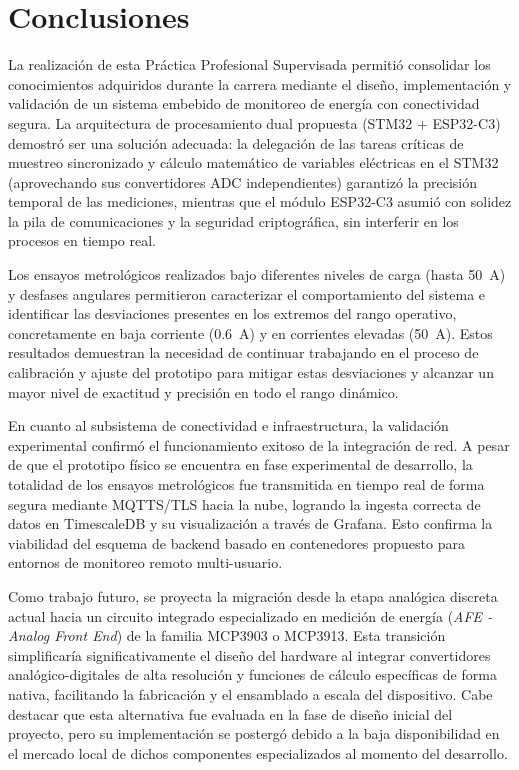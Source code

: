\documentclass[12pt, a4paper]{article} %
\begin{document}
\section{Conclusiones}

La realización de esta Práctica Profesional Supervisada permitió consolidar los conocimientos adquiridos durante la carrera mediante el diseño, implementación y validación de un sistema embebido de monitoreo de energía con conectividad segura. La arquitectura de procesamiento dual propuesta (STM32 + ESP32-C3) demostró ser una solución adecuada: la delegación de las tareas críticas de muestreo sincronizado y cálculo matemático de variables eléctricas en el STM32 (aprovechando sus convertidores ADC independientes) garantizó la precisión temporal de las mediciones, mientras que el módulo ESP32-C3 asumió con solidez la pila de comunicaciones y la seguridad criptográfica, sin interferir en los procesos en tiempo real.

Los ensayos metrológicos realizados bajo diferentes niveles de carga (hasta \qty{50}{\ampere}) y desfases angulares permitieron caracterizar el comportamiento del sistema e identificar las desviaciones presentes en los extremos del rango operativo, concretamente en baja corriente (\qty{0.6}{\ampere}) y en corrientes elevadas (\qty{50}{\ampere}). Estos resultados demuestran la necesidad de continuar trabajando en el proceso de calibración y ajuste del prototipo para mitigar estas desviaciones y alcanzar un mayor nivel de exactitud y precisión en todo el rango dinámico.

En cuanto al subsistema de conectividad e infraestructura, la validación experimental confirmó el funcionamiento exitoso de la integración de red. A pesar de que el prototipo físico se encuentra en fase experimental de desarrollo, la totalidad de los ensayos metrológicos fue transmitida en tiempo real de forma segura mediante MQTTS/TLS hacia la nube, logrando la ingesta correcta de datos en TimescaleDB y su visualización a través de Grafana. Esto confirma la viabilidad del esquema de backend basado en contenedores propuesto para entornos de monitoreo remoto multi-usuario.

Como trabajo futuro, se proyecta la migración desde la etapa analógica discreta actual hacia un circuito integrado especializado en medición de energía (\textit{AFE - Analog Front End}) de la familia MCP3903 o MCP3913. Esta transición simplificaría significativamente el diseño del hardware al integrar convertidores analógico-digitales de alta resolución y funciones de cálculo específicas de forma nativa, facilitando la fabricación y el ensamblado a escala del dispositivo. Cabe destacar que esta alternativa fue evaluada en la fase de diseño inicial del proyecto, pero su implementación se postergó debido a la baja disponibilidad en el mercado local de dichos componentes especializados al momento del desarrollo.
\end{document}
